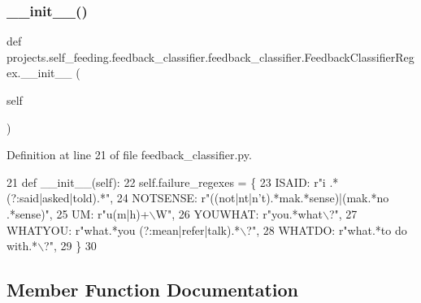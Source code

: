 \subsubsection{\texorpdfstring{\+\_\+\+\_\+init\+\_\+\+\_\+()}{\_\_init\_\_()}}
{\footnotesize\ttfamily def projects.\+self\+\_\+feeding.\+feedback\+\_\+classifier.\+feedback\+\_\+classifier.\+Feedback\+Classifier\+Regex.\+\_\+\+\_\+init\+\_\+\+\_\+ (\begin{DoxyParamCaption}\item[{}]{self }\end{DoxyParamCaption})}



Definition at line 21 of file feedback\+\_\+classifier.\+py.


\begin{DoxyCode}
21     \textcolor{keyword}{def }\_\_init\_\_(self):
22         self.failure\_regexes = \{
23             ISAID: \textcolor{stringliteral}{r"i .*(?:said|asked|told).*"},
24             NOTSENSE: \textcolor{stringliteral}{r"((not|nt|n't).*mak.*sense)|(mak.*no .*sense)"},
25             UM: \textcolor{stringliteral}{r"u(m|h)+\(\backslash\)W"},
26             YOUWHAT: \textcolor{stringliteral}{r"you.*what\(\backslash\)?"},
27             WHATYOU: \textcolor{stringliteral}{r"what.*you (?:mean|refer|talk).*\(\backslash\)?"},
28             WHATDO: \textcolor{stringliteral}{r"what.*to do with.*\(\backslash\)?"},
29         \}
30 
\end{DoxyCode}


\subsection{Member Function Documentation}
\mbox{\label{classprojects_1_1self__feeding_1_1feedback__classifier_1_1feedback__classifier_1_1FeedbackClassifierRegex_a24119cead515b84ee7308a53f821e681}} 
